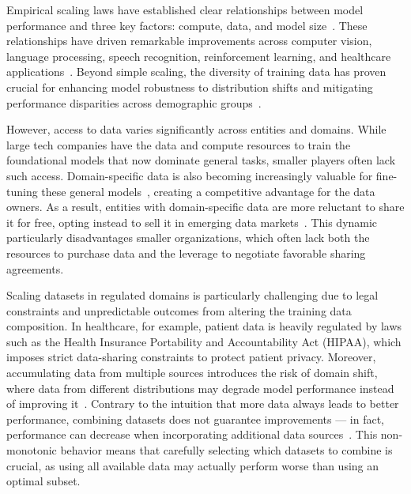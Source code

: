 Empirical scaling laws have established clear relationships between model performance and three key factors: compute, data, and model size~\cite{Hestness2017DeepLS, Kaplan2020ScalingLF}. These relationships have driven remarkable improvements across computer vision, language processing, speech recognition, reinforcement learning, and healthcare applications~\cite{sun2017revisiting,mahajan2018exploring,brown2020language,hoffmann2022training,park2019specaugment,zhang2020pushing,ashvin2020accelerating,reed2022generalist,sheller2020federated,mckinney2020international}. Beyond simple scaling, the diversity of training data has proven crucial for enhancing model robustness to distribution shifts and mitigating performance disparities across demographic groups~\cite{shen2024data,miller2021accuracy}.

However, access to data varies significantly across entities and domains. While large tech companies have the data and compute resources to train the foundational models that now dominate general tasks, smaller players often lack such access.  Domain-specific data is also becoming increasingly valuable for fine-tuning these general models~\cite{alsentzer2019publicly,gururangan2020don,lee2020biobert}, creating a competitive advantage for the data owners. As a result, entities with domain-specific data are more reluctant to share it for free, opting instead to sell it in emerging data markets~\cite{acemoglu2022too,huang2021toward,liang2018survey}. This dynamic particularly disadvantages smaller organizations, which often lack both the resources to purchase data and the leverage to negotiate favorable sharing agreements.

Scaling datasets in regulated domains is particularly challenging due to legal constraints and unpredictable outcomes from altering the training data composition. In healthcare, for example, patient data is heavily regulated by laws such as the Health Insurance Portability and Accountability Act (HIPAA), which imposes strict data-sharing constraints to protect patient privacy. Moreover, accumulating data from multiple sources introduces the risk of domain shift, where data from different distributions may degrade model performance instead of improving it~\cite{koh2021wilds,wang2022generalizing,taori2020measuring}. Contrary to the intuition that more data always leads to better performance, combining datasets does not guarantee improvements --- in fact, performance can decrease when incorporating additional data sources~\cite{bradley2021unrepresentative,meng2018statistical,shen2024data}. This non-monotonic behavior means that carefully selecting which datasets to combine is crucial, as using all available data may actually perform worse than using an optimal subset.

